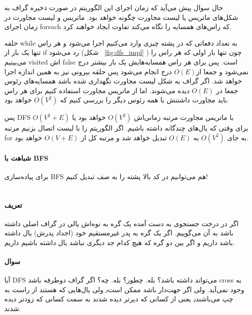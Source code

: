 حال سوال پیش می‌آید که زمان اجرای این الگوریتم در صورت ذخیره گراف به شکل‌های ماتریس یا لیست مجاورت چگونه خواهد 
بود.  ماتریس و لیست مجاورت در زمان اجرای foreach که راس‌های همسایه را نگاه می‌کند تفاوت ایجاد خواهند کرد.

حلقه while به تعداد دفعاتی که در پشته چیزی وارد می‌کنیم اجرا می‌شود و هر راس تنها یک بار از if رد می‌شود
(شکل
~\ref{fig:dfs_impl}
)
 چون تنها بار اولی که هر راس را می‌بینیم visited اش false است.  پس برای هر راس همسایه‌هایش یک بار بیشتر درج نمی‌شود و
 جمعا از$O(E)$ درج انجام می‌شود پس حلقه بیرونی نیز به همین اندازه 
   اجرا خواهد شد. اگر گراف به شکل لیست‌ مجاورت نگهداری شده باشد همسایه‌های رئوس جمعا در 
$O(E)$
  دیده می‌شوند. اما از ماتریس مجاورت استفاده کنیم برای هر راس باید مجاورت داشتنش با همه رئوس دیگر را بررسی کنیم که
$O(V^2)$
    خواهد بود.

پس DFS با ماتریس مجاورت مرتبه زمانی‌اش 
$O(V^2)$
خواهد بود یا 
$O(V^2+E)$
برای وقتی که یال‌های چندگانه داشته باشیم.
اگر الگوریتم را با 
لیست اتصال بزنیم مرتبه 
for 
به جای 
$O(V^2)$
به 
$O(E)$
تبدیل خواهد شد و مرتبه کل از 
$O(V+E)$
خواهد بود.

\paragraph{
شباهت با BFS
}
برای پیاده‌سازی BFS هم می‌توانیم در کد بالا پشته را به صف تبدیل کنیم!

\section{
}

\paragraph{تعریف}
 اگر در درخت جستجوی به دست آمده یک گره به نوه‌‌اش یالی در گراف اصلی داشته باشد به آن 
  می‌گوییم. اگر یک گره به پدر غیرمستقیم خود (اجداد پدرش) یال داشته باشد 
 داریم و اگر بین دو گره که هیچ کدام جد دیگری نباشد یال داشته باشیم 
 داریم. 

\paragraph{سوال}
 آیا DFS می‌تواند 
 داشته باشد؟ بله. 
  چطور؟ بله. 
چه؟
اگر گراف دوطرفه باشد cross به وجود نمی‌آید. ولی اگر جهت‌دار باشد ممکن است٫ ولی یال‌هایی که هستند از راست به چپ می‌باشند٫ یعنی از کسانی که دیرتر دیده شدند به سمت کسانی که زودتر دیده شدند.

